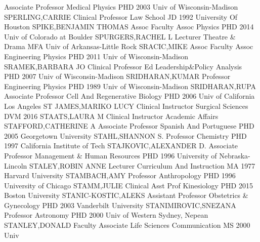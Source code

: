 \documentclass[
]{article}
\begin{document}
\textbar Associate Professor \textbar Medical Physics \textbar PHD 2003
Univ of Wisconsin-Madison \textbar SPERLING,CARRIE \textbar{}
 \textbar Clinical Professor \textbar Law School \textbar JD
1992 University Of Houston \textbar SPIKE,BENJAMIN THOMAS \textbar{}
 \textbar Assoc Faculty Assoc \textbar Physics \textbar PHD
2014 Univ of Colorado at Boulder \textbar SPURGERS,RACHEL L \textbar{}
 \textbar Lecturer \textbar Theatre \& Drama \textbar MFA
Univ of Arkansas-Little Rock \textbar SRACIC,MIKE \textbar{}
 \textbar Assoc Faculty Assoc \textbar Engineering Physics
\textbar PHD 2011 Univ of Wisconsin-Madison \textbar SRAMEK,BARBARA JO
\textbar{}  \textbar Clinical Professor \textbar Ed
Leadership\&Policy Analysis \textbar PHD 2007 Univ of Wisconsin-Madison
\textbar SRIDHARAN,KUMAR \textbar{}  \textbar Professor
\textbar Engineering Physics \textbar PHD 1989 Univ of Wisconsin-Madison
\textbar SRIDHARAN,RUPA \textbar{}  \textbar Associate
Professor \textbar Cell And Regenerative Biology \textbar PHD 2006 Univ
of California Los Angeles \textbar ST JAMES,MARIKO LUCY \textbar{}
 \textbar Clinical Instructor \textbar Surgical Sciences
\textbar DVM 2016 \textbar STAATS,LAURA M \textbar{} 
\textbar Clinical Instructor \textbar Academic Affairs
\textbar STAFFORD,CATHERINE A \textbar Associate Professor \textbar{}
 \textbar Spanish And Portuguese \textbar PHD 2005
Georgetown University \textbar STAHL,SHANNON S. \textbar Professor
\textbar{}  \textbar Chemistry \textbar PHD 1997 California
Institute of Tech \textbar STAJKOVIC,ALEXANDER D. \textbar Associate
Professor \textbar{}  \textbar Management \& Human Resources
\textbar PHD 1996 University of Nebraska-Lincoln \textbar STALEY,ROBIN
ANNE \textbar Lecturer \textbar{}  \textbar Curriculum And
Instruction \textbar MA 1977 Harvard University \textbar STAMBACH,AMY
\textbar Professor \textbar{}  \textbar Anthropology
\textbar PHD 1996 University of Chicago \textbar STAMM,JULIE
\textbar Clinical Asst Prof \textbar{}  \textbar Kinesiology
\textbar PHD 2015 Boston University \textbar STANIC-KOSTIC,ALEKS
\textbar Assistant Professor \textbar{}  \textbar Obstetrics
\& Gynecology \textbar PHD 2003 Vanderbilt University
\textbar STANIMIROVIC,SNEZANA \textbar Professor \textbar{} 
\textbar Astronomy \textbar PHD 2000 Univ of Western Sydney, Nepean
\textbar STANLEY,DONALD \textbar Faculty Associate \textbar{}
 \textbar Life Sciences Communication \textbar MS 2000 Univ
\end{document}
